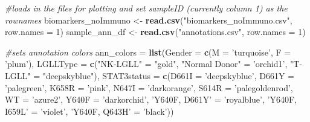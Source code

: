 \documentclass[]{article}
\newenvironment{Shaded}{\begin{snugshade}}{\end{snugshade}}
\newcommand{\KeywordTok}[1]{\textcolor[rgb]{0.13,0.29,0.53}{\textbf{{#1}}}}
\newcommand{\DataTypeTok}[1]{\textcolor[rgb]{0.13,0.29,0.53}{{#1}}}
\newcommand{\DecValTok}[1]{\textcolor[rgb]{0.00,0.00,0.81}{{#1}}}
\newcommand{\StringTok}[1]{\textcolor[rgb]{0.31,0.60,0.02}{{#1}}}
\newcommand{\CommentTok}[1]{\textcolor[rgb]{0.56,0.35,0.01}{\textit{{#1}}}}
\newcommand{\NormalTok}[1]{{#1}}
\begin{document}
\begin{Shaded}
\begin{Highlighting}[]
\CommentTok{#loads in the files for plotting and set sampleID (currently column 1) as the rownames}
\NormalTok{biomarkers_noImmuno <-}\StringTok{ }\KeywordTok{read.csv}\NormalTok{(}\StringTok{"biomarkers_noImmuno.csv"}\NormalTok{, }\DataTypeTok{row.names =} \DecValTok{1}\NormalTok{)}
\NormalTok{sample_ann_df <-}\StringTok{ }\KeywordTok{read.csv}\NormalTok{(}\StringTok{"annotations.csv"}\NormalTok{, }\DataTypeTok{row.names =} \DecValTok{1}\NormalTok{)}
\end{Highlighting}
\end{Shaded}

\begin{Shaded}
\begin{Highlighting}[]
\CommentTok{#sets annotation colors}
\NormalTok{ann_colors =}\StringTok{ }\KeywordTok{list}\NormalTok{(}\DataTypeTok{Gender =} \KeywordTok{c}\NormalTok{(}\DataTypeTok{M =} \StringTok{'turquoise'}\NormalTok{, }\DataTypeTok{F =} \StringTok{'plum'}\NormalTok{), }
                  \DataTypeTok{LGLLType =} \KeywordTok{c}\NormalTok{(}\StringTok{"NK-LGLL"} \NormalTok{=}\StringTok{ "gold"}\NormalTok{, }\StringTok{"Normal Donor"} \NormalTok{=}\StringTok{ 'orchid1'}\NormalTok{, }\StringTok{"T-LGLL"} \NormalTok{=}\StringTok{ "deepskyblue"}\NormalTok{), }
                  \DataTypeTok{STAT3status =} \KeywordTok{c}\NormalTok{(}\DataTypeTok{D661I =} \StringTok{'deepskyblue'}\NormalTok{, }\DataTypeTok{D661Y =} \StringTok{'palegreen'}\NormalTok{, }\DataTypeTok{K658R =} \StringTok{'pink'}\NormalTok{, }\DataTypeTok{N647I =} \StringTok{'darkorange'}\NormalTok{, }\DataTypeTok{S614R =} \StringTok{'palegoldenrod'}\NormalTok{, }\DataTypeTok{WT =} \StringTok{'azure2'}\NormalTok{, }\DataTypeTok{Y640F =} \StringTok{'darkorchid'}\NormalTok{, }\StringTok{'Y640F, D661Y'} \NormalTok{=}\StringTok{ 'royalblue'}\NormalTok{, }\StringTok{'Y640F, I659L'} \NormalTok{=}\StringTok{ 'violet'}\NormalTok{, }\StringTok{'Y640F, Q643H'} \NormalTok{=}\StringTok{ 'black'}\NormalTok{))}


\end{Highlighting}
\end{Shaded}
\end{document}
